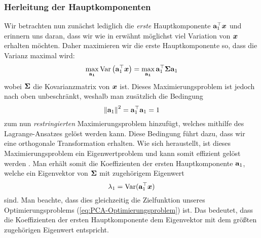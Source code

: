 \subsubsection{Herleitung der Hauptkomponenten}
\label{ch:MethodenDerDimRed:traditionell:PCA:HerleitungPC}
Wir betrachten nun zunächst lediglich die \textit{erste} Hauptkomponente $\mathbf{a}_1^\top \bm{x}$ und erinnern uns daran, dass wir wie in  erwähnt möglichst viel Variation von $\bm{x}$ erhalten möchten. Daher maximieren wir die erste Hauptkomponente so, dass die Varianz maximal wird:
\begin{equation}
	\label{eq:PCA-Optimierungsproblem}
	\max_{\mathbf{a_1}} \operatorname{Var} \left( \mathbf{a}_1^\top \bm{x} \right) = \max_{\mathbf{a_1}} \mathbf{a}_1^\top \mathbf{\Sigma} \mathbf{a}_1
\end{equation}
wobei $\mathbf{\Sigma}$ die Kovarianzmatrix von $\bm{x}$ ist. Dieses Maximierungsproblem ist jedoch nach oben unbeschränkt, weshalb man zusätzlich die Bedingung
\begin{equation}
	\left\lVert \mathbf{a}_1 \right\rVert^2 = \mathbf{a}_1^\top \mathbf{a}_1 = 1
\end{equation}
zum nun \textit{restringierten} Maximierungsproblem hinzufügt, welches mithilfe des Lagrange-Ansatzes gelöst werden kann. Diese Bedingung führt dazu, dass wir eine orthogonale Transformation erhalten. Wie sich heraustellt, ist dieses Maximierungsproblem ein Eigenwertproblem und kann somit effizient gelöst werden \parencite[vgl.][4 -- 6]{Jolliffe.2002}. Man erhält somit die Koeffizienten
der ersten Hauptkomponente $\mathbf{a}_1$, welche ein Eigenvektor von $\mathbf{\Sigma}$ mit zugehörigem
Eigenwert
\begin{equation}
	\lambda_1 = \operatorname{Var}(\mathbf{a}_1^\top \bm{x})
\end{equation}
sind. Man beachte, dass dies gleichzeitig die Zielfunktion unseres Optimierungsproblems (\eqref{eq:PCA-Optimierungsproblem}) ist. Das bedeutet, dass die Koeffizienten der ersten Hauptkomponente dem Eigenvektor mit dem größten zugehörigen Eigenwert entspricht.

